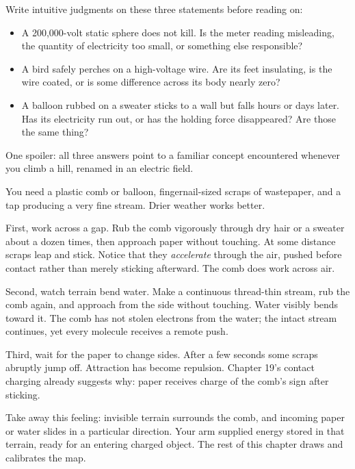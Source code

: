 
\begin{mainline}
Write intuitive judgments on these three statements before reading on:

\begin{itemize}
  \item A 200,000-volt static sphere does not kill. Is the meter reading misleading, the quantity of electricity too small, or something else responsible?
  \item A bird safely perches on a high-voltage wire. Are its feet insulating, is the wire coated, or is some difference across its body nearly zero?
  \item A balloon rubbed on a sweater sticks to a wall but falls hours or days later. Has its electricity run out, or has the holding force disappeared? Are those the same thing?
\end{itemize}

One spoiler: all three answers point to a familiar concept encountered whenever you climb a hill, renamed in an electric field.
\end{mainline}


\begin{experiment}
You need a plastic comb or balloon, fingernail-sized scraps of wastepaper, and a tap producing a very fine stream. Drier weather works better.

First, work across a gap. Rub the comb vigorously through dry hair or a sweater about a dozen times, then approach paper without touching. At some distance scraps leap and stick. Notice that they \emph{accelerate} through the air, pushed before contact rather than merely sticking afterward. The comb does work across air.

Second, watch terrain bend water. Make a continuous thread-thin stream, rub the comb again, and approach from the side without touching. Water visibly bends toward it. The comb has not stolen electrons from the water; the intact stream continues, yet every molecule receives a remote push.

Third, wait for the paper to change sides. After a few seconds some scraps abruptly jump off. Attraction has become repulsion. Chapter 19's contact charging already suggests why: paper receives charge of the comb's sign after sticking.

Take away this feeling: invisible terrain surrounds the comb, and incoming paper or water slides in a particular direction. Your arm supplied energy stored in that terrain, ready for an entering charged object. The rest of this chapter draws and calibrates the map.
\end{experiment}

